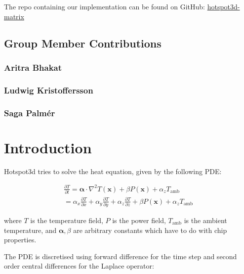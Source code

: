 The repo containing our implementation can be found on GitHub:
\href{https://github.com/arrebarritra/hotspot3d-matrix}{hotspot3d-matrix}

\hypertarget{group-member-contributions}{%
\subsection{Group Member
Contributions}\label{group-member-contributions}}

\hypertarget{aritra-bhakat}{%
\subsubsection{Aritra Bhakat}\label{aritra-bhakat}}

\hypertarget{ludwig-kristoffersson}{%
\subsubsection{Ludwig Kristoffersson}\label{ludwig-kristoffersson}}

\hypertarget{saga-palmuxe9r}{%
\subsubsection{Saga Palmér}\label{saga-palmuxe9r}}

\hypertarget{introduction}{%
\section{Introduction}\label{introduction}}

Hotspot3d tries to solve the heat equation, given by the following PDE:

\begin{align}
    \frac{\partial T}{\partial t} = \mathbf{\alpha} \cdot \nabla^2 T(\mathbf{x}) + \beta P(\mathbf{x}) + \alpha_z T_{\text{amb}} \\
    = \alpha_x \frac{\partial T}{\partial x} + \alpha_y \frac{\partial T}{\partial y} + \alpha_z \frac{\partial T}{\partial z} + \beta P(\mathbf{x}) + \alpha_z T_{\text{amb}}
\end{align}

where \(T\) is the temperature field, \(P\) is the power field,
\(T_{\text{amb}}\) is the ambient temperature, and
\(\mathbf{\alpha}, \beta\) are arbitrary constants which have to do with
chip properties.

The PDE is discretised using forward difference for the time step and
second order central differences for the Laplace operator:

